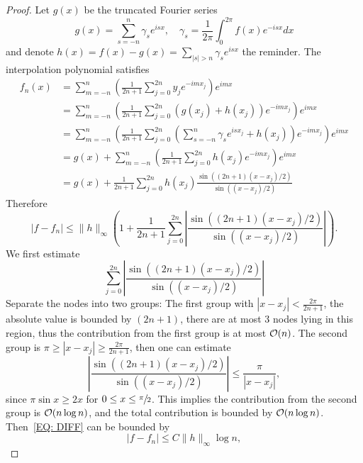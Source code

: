 \begin{proof}
    Let $g(x)$ be the truncated Fourier series
    $$g(x) = \sum_{s = -n}^n \gamma_s e^{is x},\quad \gamma_s = \frac{1}{2\pi}\int_{0}^{2\pi} f(x) e^{-isx} dx$$
   and denote $h(x) = f(x)- g(x) = \sum_{|s| > n} \gamma_s e^{isx}$ the reminder. The interpolation polynomial satisfies
    \begin{equation}
        \begin{aligned}
            f_n(x)& = \sum_{m=-n}^n \left(\frac{1}{2n+1}\sum_{j=0}^{2n} y_j e^{-im x_j}\right) e^{im x}  \\
             &=\sum_{m=-n}^n \left(\frac{1}{2n+1}\sum_{j=0}^{2n} ( g(x_j) + h(x_j) ) e^{-im x_j}\right) e^{im x} \\
             &= \sum_{m=-n}^n \left(\frac{1}{2n+1}\sum_{j=0}^{2n} ( \sum_{s = -n}^n \gamma_s  e^{is x_j }+ h(x_j) ) e^{-im x_j}\right) e^{im x} \\
             &=g(x)+ \sum_{m=-n}^n \left(\frac{1}{2n+1}\sum_{j=0}^{2n} h(x_j) e^{-im x_j}\right)e^{im x} \\
             &=g(x)+ \frac{1}{2n+1} \sum_{j=0}^{2n} h(x_j) \frac{\sin((2n+1)(x-x_j)/2)}{\sin((x-x_j)/2)}
        \end{aligned}
    \end{equation}
    Therefore 
    \begin{equation}\label{EQ: DIFF}
        |f - f_n| \le \|h\|_{\infty} \left( 1 + \frac{1}{2n+1} \sum_{j=0}^{2n} \left|\frac{\sin((2n+1)(x-x_j)/2)}{\sin((x-x_j)/2)}\right|\right).
    \end{equation}
    We first estimate 
    $$\sum_{j=0}^{2n} \left|\frac{\sin((2n+1)(x-x_j)/2)}{\sin((x-x_j)/2)}\right|$$
    Separate the nodes into two groups: The first group with $|x - x_j| < \frac{2\pi}{2n+1}$, the absolute value is bounded by $(2n+1)$, there are at most $3$ nodes lying in this region, thus the contribution from the first group is at most $\mathcal O(n)$. The second group is $\pi\ge |x - x_j| \ge \frac{2\pi}{2n+1}$, then one can estimate 
    \begin{equation}
        \left|\frac{\sin((2n+1)(x-x_j)/2)}{\sin((x-x_j)/2)}\right| \le \frac{\pi}{|x - x_j|},
    \end{equation}
    since $\pi \sin x \ge 2x $ for $0\le x\le \sfrac{\pi}{2}$. This implies the contribution from the second group is $\mathcal O(n\log n)$, and the total contribution is bounded by $\mathcal O(n\log n)$. Then~\eqref{EQ: DIFF} can be bounded by 
    \begin{equation}
        |f - f_n| \le C \|h\|_{\infty} \log n,

\end{equation}
\end{proof}
